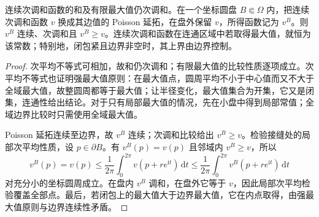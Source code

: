 \begin{lemma}
	\label{g4:lem:0501:perron-operations}
	连续次调和函数的和及有限最大值仍次调和。在一个坐标圆盘 \(B\Subset\Omega\) 内，把连续次调和函数 \(v\) 换成其边值的 Poisson 延拓，在盘外保留 \(v\)，所得函数记为 \(v^B\)。则 \(v^B\) 连续、次调和且 \(v^B\ge v\)。连续次调和函数在连通区域中若取得最大值，就恒为该常数；特别地，闭包紧且边界非空时，其上界由边界控制。
\end{lemma}
\begin{proof}
	次平均不等式可相加，故和仍次调和；有限最大值的比较性质逐项成立。次平均不等式也证明强最大值原则：在最大值点，圆周平均不小于中心值而又不大于全域最大值，故整圆周都等于最大值；让半径变化，最大值集合为开集，它又是闭集，连通性给出结论。对于只有局部最大值的情况，先在小盘中得到局部常值；全域边界比较时只需使用全域最大值。

	Poisson 延拓连续至边界，故 \(v^B\) 连续；次调和比较给出 \(v^B\ge v\)。检验接缝处的局部次平均性质，设 \(p\in\partial B\)。有 \(v^B(p)=v(p)\) 且邻域内 \(v^B\ge v\)，所以
	\[
		v^B(p)=v(p)\le\frac1{2\pi}\int_0^{2\pi}v(p+re^{\mathrm{i}t})\,\mathrm{d}t
		\le\frac1{2\pi}\int_0^{2\pi}v^B(p+re^{\mathrm{i}t})\,\mathrm{d}t
	\]
	对充分小的坐标圆周成立。在盘内 \(v^B\) 调和，在盘外它等于 \(v\)，因此局部次平均检验覆盖全部点。最后，若闭包上的最大值大于边界最大值，它在内点取得，由强最大值原则与边界连续性矛盾。
\end{proof}

